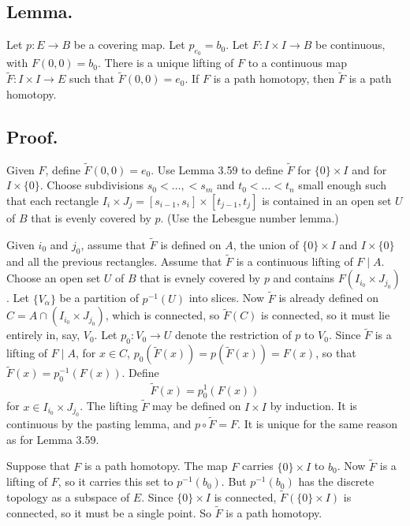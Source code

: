 \documentclass[titlepage]{article}
\begin{document}
\subsection{Lemma.} Let $p: E \to B$ be a covering map. Let $p_{e_{0}} = b_{0}$. Let $F: I \times I \to B$ be continuous, with $F(0, 0) = b_{0}$. There is a unique lifting of $F$ to a continuous map $\tilde{F}: I \times I \to E$ such that $\tilde{F}(0, 0) = e_{0}$. If $F$ is a path homotopy, then $\tilde{F}$ is a path homotopy.

\subsection{Proof.} Given $F$, define $\tilde{F}(0, 0) = e_{0}$. Use Lemma 3.59 to define $\tilde{F}$ for $\{0\} \times I$ and for $I \times \{0\}$. Choose subdivisions $s_{0} < \ldots, < s_{m}$ and $t_{0} < \ldots < t_{n}$ small enough such that each rectangle $I_{i} \times J_{j} = [s_{i-1}, s_{i}] \times [t_{j-1}, t_{j}]$ is contained in an open set $U$ of $B$ that is evenly covered by $p$. (Use the Lebesgue number lemma.)

Given $i_{0}$ and $j_{0}$, assume that $\tilde{F}$ is defined on $A$, the union of $\{0\} \times I$ and $I \times \{0\}$ and all the previous rectangles. Assume that $\tilde{F}$ is a continuous lifting of $F \mid A$. Choose an open set $U$ of $B$ that is evnely covered by $p$ and contains $F(I_{i_{0}} \times J_{j_{0}})$. Let $\{V_{\alpha}\}$ be a partition of $p^{-1}(U)$ into slices. Now $\tilde{F}$ is already defined on $C = A \cap (I_{i_{0}} \times J_{j_{0}})$, which is connected, so $\tilde{F}(C)$ is connected, so it must lie entirely in, say, $V_{0}$. Let $p_{0}: V_{0} \to U$ denote the restriction of $p$ to $V_{0}$. Since $\tilde{F}$ is a lifting of $F \mid A$, for $x \in C$, $p_{0}(\tilde{F}(x)) = p(\tilde{F}(x)) = F(x)$, so that $\tilde{F}(x) = p_{0}^{-1}(F(x))$. Define 
$$\tilde{F}(x) = p_{0}^{1}(F(x))$$
for $x \in I_{i_{0}} \times J_{j_{0}}$. The lifting $\tilde{F}$ may be defined on $I \times I$ by induction. It is continuous by the pasting lemma, and $p \circ \tilde{F} = F$. It is unique for the same reason as for Lemma 3.59.

Suppose that $F$ is a path homotopy. The map $F$ carries $\{0\} \times I$ to $b_{0}$. Now $\tilde{F}$ is a lifting of $F$, so it carries this set to $p^{-1}(b_{0})$. But $p^{-1}(b_{0})$ has the discrete topology as a subspace of $E$. Since $\{0\} \times I$ is connected, $\tilde{F}(\{0\} \times I)$ is connected, so it must be a single point. So $\tilde{F}$ is a path homotopy.
\end{document}
